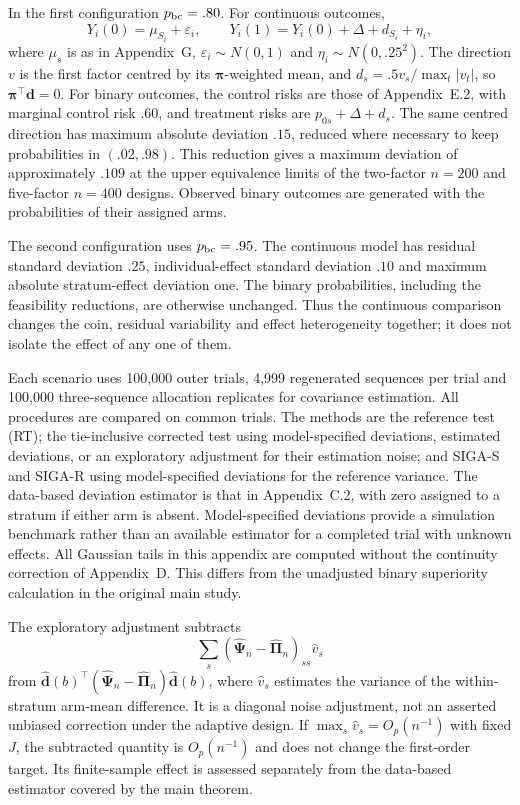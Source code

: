 \documentclass[12pt,a4paper]{article}
\theoremstyle{definition}
\theoremstyle{remark}\newtheorem{remark}{Remark}
\numberwithin{equation}{section}
\begin{document}
In the first configuration $p_{\rm bc}=.80$. For continuous outcomes,
\[
 Y_i(0)=\mu_{S_i}+\varepsilon_i,\qquad
 Y_i(1)=Y_i(0)+\Delta+d_{S_i}+\eta_i,
\]
where $\mu_s$ is as in Appendix~G, $\varepsilon_i\sim N(0,1)$ and $\eta_i\sim N(0,.25^2)$. The direction $v$ is the first factor centred by its $\bm\pi$-weighted mean, and $d_s=.5v_s/\max_t|v_t|$, so $\bm\pi^\top\bm d=0$. For binary outcomes, the control risks are those of Appendix~E.2, with marginal control risk $.60$, and treatment risks are $p_{0s}+\Delta+d_s$. The same centred direction has maximum absolute deviation $.15$, reduced where necessary to keep probabilities in $(.02,.98)$. This reduction gives a maximum deviation of approximately $.109$ at the upper equivalence limits of the two-factor $n=200$ and five-factor $n=400$ designs. Observed binary outcomes are generated with the probabilities of their assigned arms.

The second configuration uses $p_{\rm bc}=.95$. The continuous model has residual standard deviation $.25$, individual-effect standard deviation $.10$ and maximum absolute stratum-effect deviation one. The binary probabilities, including the feasibility reductions, are otherwise unchanged. Thus the continuous comparison changes the coin, residual variability and effect heterogeneity together; it does not isolate the effect of any one of them.

Each scenario uses 100,000 outer trials, 4,999 regenerated sequences per trial and 100,000 three-sequence allocation replicates for covariance estimation. All procedures are compared on common trials. The methods are the reference test (RT); the tie-inclusive corrected test using model-specified deviations, estimated deviations, or an exploratory adjustment for their estimation noise; and SIGA-S and SIGA-R using model-specified deviations for the reference variance. The data-based deviation estimator is that in Appendix~C.2, with zero assigned to a stratum if either arm is absent. Model-specified deviations provide a simulation benchmark rather than an available estimator for a completed trial with unknown effects. All Gaussian tails in this appendix are computed without the continuity correction of Appendix~D. This differs from the unadjusted binary superiority calculation in the original main study.

The exploratory adjustment subtracts
\[
 \sum_s(\widehat{\bm\Psi}_n-\widehat{\bm\Pi}_n)_{ss}\widehat v_s
\]
from $\widehat{\bm d}(b)^\top(\widehat{\bm\Psi}_n-\widehat{\bm\Pi}_n)\widehat{\bm d}(b)$, where $\widehat v_s$ estimates the variance of the within-stratum arm-mean difference. It is a diagonal noise adjustment, not an asserted unbiased correction under the adaptive design. If $\max_s\widehat v_s=O_p(n^{-1})$ with fixed $J$, the subtracted quantity is $O_p(n^{-1})$ and does not change the first-order target. Its finite-sample effect is assessed separately from the data-based estimator covered by the main theorem.
\end{document}

